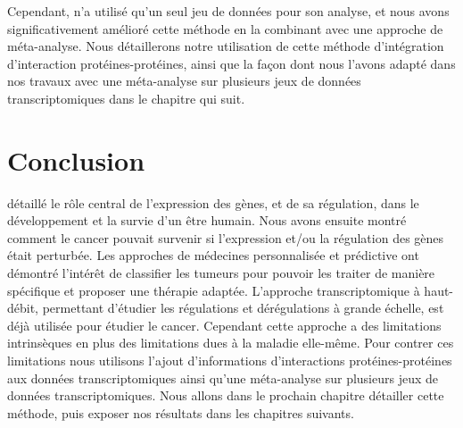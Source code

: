 			Cependant, \citeauthor{Chuang2007} n'a utilisé qu'un seul jeu de données pour son analyse, et nous avons significativement amélioré cette méthode en la combinant avec une approche de méta-analyse.
			Nous détaillerons notre utilisation de cette méthode d'intégration d'interaction protéines-protéines, ainsi que la façon dont nous l'avons adapté dans nos travaux avec une méta-analyse sur plusieurs jeux de données transcriptomiques dans le chapitre qui suit.


	\section{\textcolor{myred}{Conclusion}}

		 détaillé le rôle central de l'expression des gènes, et de sa régulation, dans le développement et la survie d'un être humain.
		Nous avons ensuite montré comment le cancer pouvait survenir si l'expression et/ou la régulation des gènes était perturbée.
		Les approches de médecines personnalisée et prédictive ont démontré l'intérêt de classifier les tumeurs pour pouvoir les traiter de manière spécifique et proposer une thérapie adaptée.
		L'approche transcriptomique à haut-débit, permettant d'étudier les régulations et dérégulations à grande échelle, est déjà utilisée pour étudier le cancer.
		Cependant cette approche a des limitations intrinsèques en plus des limitations dues à la maladie elle-même.
		Pour contrer ces limitations nous utilisons l'ajout d'informations d'interactions protéines-protéines aux données transcriptomiques ainsi qu'une méta-analyse sur plusieurs jeux de données transcriptomiques.
		Nous allons dans le prochain chapitre détailler cette méthode, puis exposer nos résultats dans les chapitres suivants.